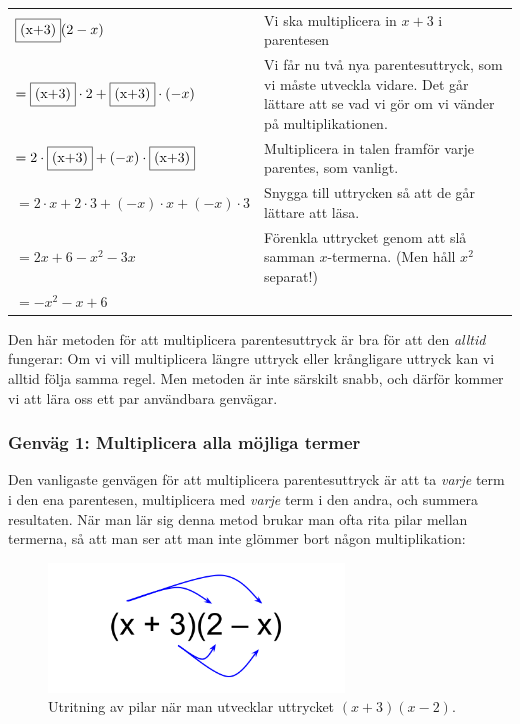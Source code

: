 \smallskip
\begin{tabular}{l|p{5.7cm}}
  $\framebox{(x+3)} (2-x)$ & Vi ska multiplicera in $x+3$ i parentesen \\
  $= \framebox{(x+3)} \cdot 2 + \framebox{(x+3)} \cdot (-x)$ & Vi får nu två nya parentesuttryck, som vi måste utveckla vidare. Det går lättare att se vad vi gör om vi vänder på multiplikationen. \\
  $=2 \cdot \framebox{(x+3)} + (-x) \cdot \framebox{(x+3)}$ & Multiplicera in talen framför varje parentes, som vanligt. \\
  $=2 \cdot x + 2 \cdot 3 + (-x) \cdot x + (-x) \cdot 3$ & Snygga till uttrycken så att de går lättare att läsa. \\
  $=2x + 6 - x^2  - 3x$ & Förenkla uttrycket genom att slå samman $x$-termerna. (Men håll $x^2$ separat!) \\
  $=-x^2 - x + 6$ & \\
\end{tabular}
\smallskip

Den här metoden för att multiplicera parentesuttryck är bra för att den \emph{alltid} fungerar:
Om vi vill multiplicera längre uttryck eller krångligare uttryck kan vi alltid följa samma regel.
Men metoden är inte särskilt snabb, och därför kommer vi att lära oss ett par användbara genvägar.

\subsubsection{Genväg 1: Multiplicera alla möjliga termer}

Den vanligaste genvägen för att multiplicera parentesuttryck är att ta \emph{varje} term i den ena parentesen, multiplicera med \emph{varje} term i den andra, och summera resultaten.
När man lär sig denna metod brukar man ofta rita pilar mellan termerna, så att man ser att man inte glömmer bort någon multiplikation:

\begin{figure}
  \centering
  \includegraphics[width=0.7\textwidth]{bilder/parentesmultiplikation.svg}
  \caption{\label{fig:parentesmultiplikation}Utritning av pilar när man utvecklar uttrycket $(x+3)(x-2)$.}
\end{figure}

